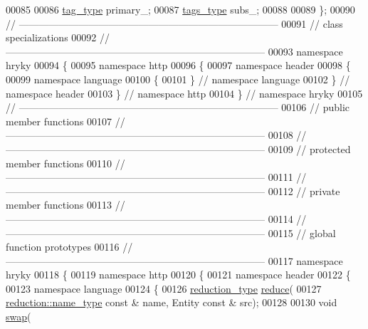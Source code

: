 \begin{DoxyCode}
00085 
00086     \hyperlink{classhryky_1_1_fixed_vector}{tag_type} primary\_;
00087     \hyperlink{classhryky_1_1_vector}{tags_type} subs\_;
00088 
00089 \};
00090 \textcolor{comment}{//
      ------------------------------------------------------------------------------}
00091 \textcolor{comment}{// class specializations}
00092 \textcolor{comment}{//
      ------------------------------------------------------------------------------}
00093 \textcolor{keyword}{namespace }hryky
00094 \{
00095 \textcolor{keyword}{namespace }http
00096 \{
00097 \textcolor{keyword}{namespace }header
00098 \{
00099 \textcolor{keyword}{namespace }language
00100 \{
00101 \} \textcolor{comment}{// namespace language}
00102 \} \textcolor{comment}{// namespace header}
00103 \} \textcolor{comment}{// namespace http}
00104 \} \textcolor{comment}{// namespace hryky}
00105 \textcolor{comment}{//
      ------------------------------------------------------------------------------}
00106 \textcolor{comment}{// public member functions}
00107 \textcolor{comment}{//
      ------------------------------------------------------------------------------}
00108 \textcolor{comment}{//
      ------------------------------------------------------------------------------}
00109 \textcolor{comment}{// protected member functions}
00110 \textcolor{comment}{//
      ------------------------------------------------------------------------------}
00111 \textcolor{comment}{//
      ------------------------------------------------------------------------------}
00112 \textcolor{comment}{// private member functions}
00113 \textcolor{comment}{//
      ------------------------------------------------------------------------------}
00114 \textcolor{comment}{//
      ------------------------------------------------------------------------------}
00115 \textcolor{comment}{// global function prototypes}
00116 \textcolor{comment}{//
      ------------------------------------------------------------------------------}
00117 \textcolor{keyword}{namespace }hryky
00118 \{
00119 \textcolor{keyword}{namespace }http
00120 \{
00121 \textcolor{keyword}{namespace }header
00122 \{
00123 \textcolor{keyword}{namespace }language
00124 \{
00126     \hyperlink{namespacehryky_a343a9a4c36a586be5c2693156200eadc}{reduction_type} \hyperlink{namespacehryky_1_1http_a08fc36a78a8e2908140fcd102829a566}{reduce}(
00127         \hyperlink{namespacehryky_1_1reduction_ac686c30a4c8d196bbd0f05629a6b921f}{reduction::name_type} \textcolor{keyword}{const} & name, Entity \textcolor{keyword}{const} & src);
00128 
00130     \textcolor{keywordtype}{void} \hyperlink{namespacehryky_1_1http_a38e62595ad532d18fbc65ceb61973aec}{swap}(

\end{DoxyCode}
